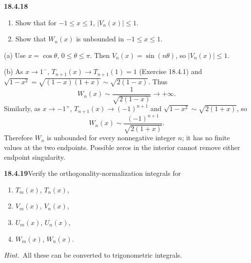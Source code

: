 \par\bigskip
\noindent\textbf{18.4.18}
\begin{enumerate}
\item[(a)] Show that for $-1\le x\le1$, $\big|V_{n}(x)\big|\le1$.
\item[(b)] Show that $W_{n}(x)$ is unbounded in $-1\le x\le1$.
\end{enumerate}
\par\nobreak
\solution
(a) Use $x=\cos\theta$, $0\le\theta\le\pi$.
Then $V_n(x)=\sin(n\theta)$, so $\boxed{|V_n(x)|\le1}$.

(b) As $x\to1^-$, $T_{n+1}(x)\to T_{n+1}(1)=1$ (Exercise 18.4.1) and
$\sqrt{1-x^2}=\sqrt{(1-x)(1+x)}\sim\sqrt{2(1-x)}$.  Thus
\[
W_n(x)\sim\frac1{\sqrt{2(1-x)}}\longrightarrow+\infty.
\]
Similarly, as $x\to-1^+$, $T_{n+1}(x)\to(-1)^{n+1}$ and
$\sqrt{1-x^2}\sim\sqrt{2(1+x)}$, so
\[
W_n(x)\sim\frac{(-1)^{n+1}}{\sqrt{2(1+x)}}.
\]
Therefore $W_n$ is unbounded for every nonnegative integer $n$;
it has no finite values at the two endpoints.  Possible zeros in
the interior cannot remove either endpoint singularity.

\par\bigskip
\noindent\textbf{18.4.19}\quad Verify the orthogonality-normalization
integrals for
\begin{enumerate}
\item[(a)] $T_{m}(x)$, $T_{n}(x)$,
\item[(b)] $V_{m}(x)$, $V_{n}(x)$,
\item[(c)] $U_{m}(x)$, $U_{n}(x)$,
\item[(d)] $W_{m}(x)$, $W_{n}(x)$.
\end{enumerate}
\par\emph{Hint.}~All these can be converted to trigonometric
integrals.
\par\nobreak
\solution
{}\par

